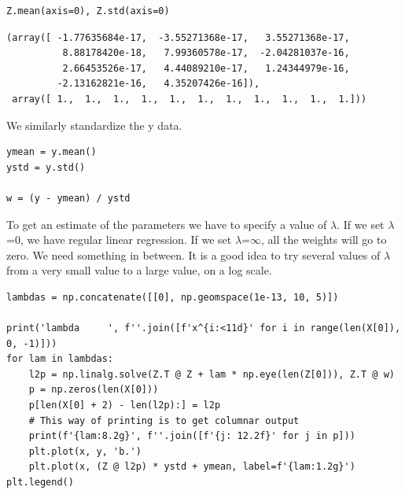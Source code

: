 \documentclass[11pt]{article}
\begin{document}
\begin{verbatim}
Z.mean(axis=0), Z.std(axis=0)
\end{verbatim}

\begin{verbatim}
(array([ -1.77635684e-17,  -3.55271368e-17,   3.55271368e-17,
          8.88178420e-18,   7.99360578e-17,  -2.04281037e-16,
          2.66453526e-17,   4.44089210e-17,   1.24344979e-16,
         -2.13162821e-16,   4.35207426e-16]),
 array([ 1.,  1.,  1.,  1.,  1.,  1.,  1.,  1.,  1.,  1.,  1.]))
\end{verbatim}

We similarly standardize the y data.

\begin{verbatim}
ymean = y.mean()
ystd = y.std()

w = (y - ymean) / ystd
\end{verbatim}

To get an estimate of the parameters we have to specify a value of \(\lambda\). If we set \(\lambda\)=0, we have regular linear regression. If we set \(\lambda\)=\(\infty\), all the weights will go to zero. We need something in between. It is a good idea to try several values of \(\lambda\) from a very small value to a large value, on a log scale.


\begin{verbatim}
lambdas = np.concatenate([[0], np.geomspace(1e-13, 10, 5)])

print('lambda     ', f''.join([f'x^{i:<11d}' for i in range(len(X[0]), 0, -1)]))
for lam in lambdas:
    l2p = np.linalg.solve(Z.T @ Z + lam * np.eye(len(Z[0])), Z.T @ w)
    p = np.zeros(len(X[0]))
    p[len(X[0] + 2) - len(l2p):] = l2p
    # This way of printing is to get columnar output
    print(f'{lam:8.2g}', f''.join([f'{j: 12.2f}' for j in p]))
    plt.plot(x, y, 'b.')
    plt.plot(x, (Z @ l2p) * ystd + ymean, label=f'{lam:1.2g}')
plt.legend()
\end{verbatim}
\end{document}
